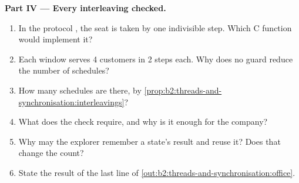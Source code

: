 \begin{problem}
\medskip\noindent\textbf{Part IV --- Every interleaving checked.}\par\nopagebreak
\begin{enumerate}[resume, beginpenalty=10000]
\item In the protocol , the seat is taken by one indivisible step. Which C function would implement it?
\item Each window serves 4 customers in 2 steps each. Why does no guard reduce the number of schedules?
\item How many schedules are there, by \cref{prop:b2:threads-and-synchronisation:interleavings}?
\item What does the check  require, and why is it enough for the company?
\item Why may the explorer remember a state's result and reuse it? Does that change the count?
\item State the result of the last line of \cref{out:b2:threads-and-synchronisation:office}.
\end{enumerate}
\end{problem}
